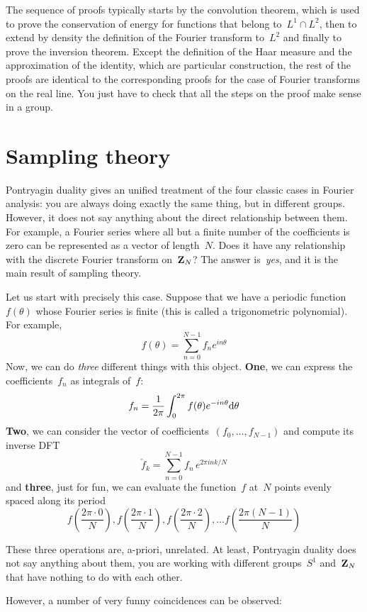 The sequence of proofs typically starts by the convolution theorem,
which is used to prove the conservation of energy for functions that
belong to~$L^1\cap L^2$, then to extend by density the definition of
the Fourier transform to~$L^2$ and finally to prove the inversion
theorem.  Except the definition of the Haar measure and the
approximation of the identity, which are particular construction, the
rest of the proofs are identical to the corresponding proofs for the
case of Fourier transforms on the real line.  You just have to check
that all the steps on the proof make sense in a group.


\section{Sampling theory}

Pontryagin duality gives an unified treatment of the four classic
cases in Fourier analysis: you are always doing exactly the same
thing, but in different groups.  However, it does not say anything
about the direct relationship between them.  For example, a Fourier
series where all but a finite number of the coefficients is zero can
be represented as a vector of length~$N$.  Does it have any
relationship with the discrete Fourier transform on~$\mathbf{Z}_N$?  The
answer is~\emph{yes}, and it is the main result of sampling theory.

Let us start with precisely this case.  Suppose that we have a
periodic function~$f(\theta)$ whose Fourier series is finite (this is
called a trigonometric polynomial).  For
example,
$$
f(\theta)=\sum_{n=0}^{N-1} f_ne ^{in\theta}
$$
Now, we can do \emph{three} different things with this object.  {\bf
One}, we can express the coefficients~$f_n$ as integrals of~$f$:
$$
f_n = \frac{1}{2\pi}\int_0^{2\pi} f(\theta)e^{-in\theta}\mathrm{d}\theta
$$
{\bf Two}, we can consider the vector of
coefficients~$(f_0,\ldots,f_{N-1})$ and compute its inverse DFT
$$
\check{f}_k = \sum_{n=0}^{N-1} f_n\,e^{2\pi i nk/N}
$$
and {\bf three}, just for fun, we can evaluate the function~$f$
at~$N$ points evenly spaced along its period
$$
f\left(\frac{2\pi\cdot 0}{N}\right),
f\left(\frac{2\pi\cdot 1}{N}\right),
f\left(\frac{2\pi\cdot 2}{N}\right),
\ldots
f\left(\frac{2\pi(N-1)}{N}\right)
$$

These three operations are, a-priori, unrelated.  At least,
Pontryagin duality does not say anything about them, you are
working with different groups~$S^1$ and~$\mathbf{Z}_N$ that have nothing to
do with each other.

However, a number of very funny coincidences can be observed:

